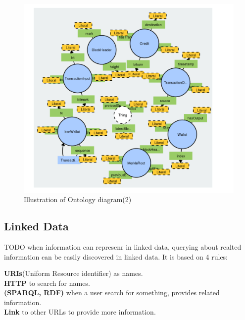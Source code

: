  \begin{center}
 
 	
 	\begin{figure}[htb!]
 		
 		\begin{minipage}{0.55\linewidth}
 			\centering
 			\includegraphics[width=1.65\textwidth]{images/chap02_diagram_ontology.png}
 		\end{minipage}
 		\caption[Illustration of Ontology diagram]{Illustration of Ontology diagram(2)}
 		
 		
 	\end{figure}
 	
 \end{center}
 
\subsection{Linked Data}
TODO
when information can represenr in linked data, querying about realted information can be easily discovered in linked data. It is based on 4 rules:

	\textbf{URIs}(Uniform Resource identifier) as names.\\ 
	\textbf{HTTP} to search for names.\\
	\textbf{(SPARQL, RDF)}  when a user search for something, provides related information.\\
	\textbf{Link} to other URLs to provide more information.\\


